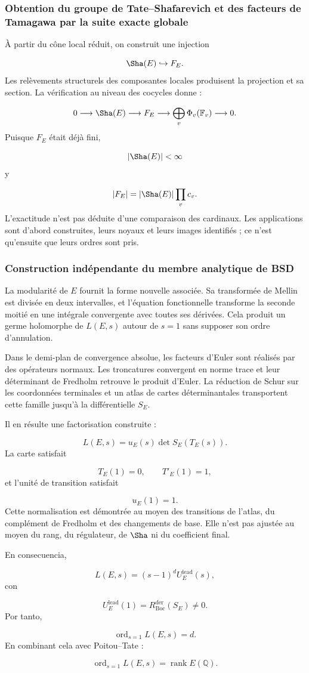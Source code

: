 \subsubsection{Obtention du groupe de Tate–Shafarevich et des facteurs de Tamagawa par la suite exacte globale}
À partir du cône local réduit, on construit une injection\par
\[
\Sha(E)\hookrightarrow F_E.
\]
Les relèvements structurels des composantes locales produisent la projection et sa section. La vérification au niveau des cocycles donne :\par
\[
0
\longrightarrow
\Sha(E)
\longrightarrow
F_E
\longrightarrow
\bigoplus_v\Phi_v(\mathbb F_v)
\longrightarrow
0.
\]
Puisque \(F_E\) était déjà fini,\par
\[
|\Sha(E)|<\infty
\]
y\par
\[
|F_E|
=
|\Sha(E)|
\prod_v c_v.
\]
L’exactitude n’est pas déduite d’une comparaison des cardinaux. Les applications sont d’abord construites, leurs noyaux et leurs images identifiés ; ce n’est qu’ensuite que leurs ordres sont pris.\par
{}
\subsubsection{Construction indépendante du membre analytique de BSD}
La modularité de \(E\) fournit la forme nouvelle associée. Sa transformée de Mellin est divisée en deux intervalles, et l’équation fonctionnelle transforme la seconde moitié en une intégrale convergente avec toutes ses dérivées. Cela produit un germe holomorphe de \(L(E,s)\) autour de \(s=1\) sans supposer son ordre d’annulation.\par
Dans le demi-plan de convergence absolue, les facteurs d’Euler sont réalisés par des opérateurs normaux. Les troncatures convergent en norme trace et leur déterminant de Fredholm retrouve le produit d’Euler. La réduction de Schur sur les coordonnées terminales et un atlas de cartes déterminantales transportent cette famille jusqu’à la différentielle \(S_E\).\par
Il en résulte une factorisation construite :\par
\[
L(E,s)
=
u_E(s)
\det S_E(T_E(s)).
\]
La carte satisfait\par
\[
T_E(1)=0,
\qquad
T'_E(1)=1,
\]
et l’unité de transition satisfait\par
\[
u_E(1)=1.
\]
Cette normalisation est démontrée au moyen des transitions de l’atlas, du complément de Fredholm et des changements de base. Elle n’est pas ajustée au moyen du rang, du régulateur, de \(\Sha\) ni du coefficient final.\par
En consecuencia,\par
\[
L(E,s)
=
(s-1)^dU_E^{\mathrm{lead}}(s),
\]
con\par
\[
U_E^{\mathrm{lead}}(1)
=
R_{\mathrm{Boc}}^{\mathrm{der}}(S_E)
\neq0.
\]
Por tanto,\par
\[
\operatorname{ord}_{s=1}L(E,s)=d.
\]
En combinant cela avec Poitou–Tate :\par
\[
\operatorname{ord}_{s=1}L(E,s)
=
\operatorname{rank}E(\mathbb Q).
\]
